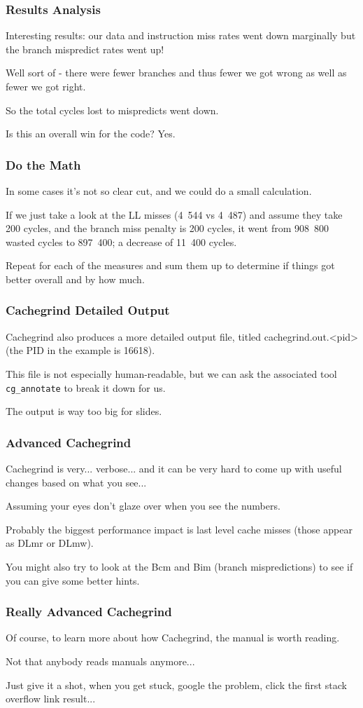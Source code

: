\begin{frame}
\frametitle{Results Analysis}


Interesting results: our data and instruction miss rates went down marginally but the branch mispredict rates went up!

Well sort of - there were fewer branches and thus fewer we got wrong as well as fewer we got right. 

So the total cycles lost to mispredicts went down. 

Is this an overall win for the code? Yes. 


\end{frame}
\begin{frame}
\frametitle{Do the Math}

In some cases it's not so clear cut, and we could do a small calculation. 

If we just take a look at the LL misses (4~544 vs 4~487) and assume they take 200 cycles, and the branch miss penalty is 200 cycles, it went from 908~800 wasted cycles to 897~400; a decrease of 11~400 cycles.

  Repeat for each of the measures and sum them up to determine if things got better overall and by how much.

\end{frame}
\begin{frame}
\frametitle{Cachegrind Detailed Output}

Cachegrind also produces a more detailed output file, titled cachegrind.out.<pid> (the PID in the example is 16618). 

This file is not especially human-readable, but we can ask the associated tool \texttt{cg\_annotate} to break it down for us.

The output is way too big for slides.

\end{frame}
\begin{frame}
\frametitle{Advanced Cachegrind}

Cachegrind is very... verbose... and it can be very hard to come up with useful changes based on what you see... 

Assuming your eyes don't glaze over when you see the numbers. 

Probably the biggest performance impact is last level cache misses (those appear as DLmr or DLmw). 

You might also try to look at the Bcm and Bim (branch mispredictions) to see if you can give some better hints. 
\end{frame}
\begin{frame}
\frametitle{Really Advanced Cachegrind}

Of course, to learn more about how Cachegrind, the manual is worth reading. 

Not that anybody reads manuals anymore... 

Just give it a shot, when you get stuck, google the problem, click the first stack overflow link result...


\end{frame}




